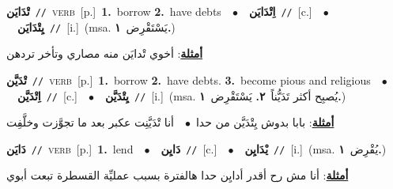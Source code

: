 \documentclass[10pt,a4paper,twoside]{article} %
\begin{document}
\begin{multicols}{2}
{\setlength\topsep{0pt}\textbf{\foreignlanguage{arabic}{تْدَايَن}}\ {\color{gray}\texttt{//}\color{black}}\ \textsc{verb}\ [p.]\ \textbf{1.}~borrow  \textbf{2.}~have debts\ \ $\bullet$\ \ \setlength\topsep{0pt}\textbf{\foreignlanguage{arabic}{اِتْدَايَن}}\ {\color{gray}\texttt{//}\color{black}}\ [c.]\ \ $\bullet$\ \ \setlength\topsep{0pt}\textbf{\foreignlanguage{arabic}{يِتْدَايَن}}\ {\color{gray}\texttt{//}\color{black}}\ [i.]\ \color{gray}(msa. \foreignlanguage{arabic}{يَسْتَقْرِض}~\foreignlanguage{arabic}{\textbf{١.}})\color{black}\  \begin{flushright}\color{gray}\foreignlanguage{arabic}{\textbf{\underline{\foreignlanguage{arabic}{أمثلة}}}: أخوي تْدايَن منه مصاري وتأخر تردهن}\end{flushright}\color{black}} \vspace{2mm}

{\setlength\topsep{0pt}\textbf{\foreignlanguage{arabic}{تْدَيَّن}}\ {\color{gray}\texttt{//}\color{black}}\ \textsc{verb}\ [p.]\ \textbf{1.}~borrow  \textbf{2.}~have debts.  \textbf{3.}~become pious and religious\ \ $\bullet$\ \ \setlength\topsep{0pt}\textbf{\foreignlanguage{arabic}{اِتْدَيَّن}}\ {\color{gray}\texttt{//}\color{black}}\ [c.]\ \ $\bullet$\ \ \setlength\topsep{0pt}\textbf{\foreignlanguage{arabic}{يِتْدَيَّن}}\ {\color{gray}\texttt{//}\color{black}}\ [i.]\ \color{gray}(msa. \foreignlanguage{arabic}{يُصبِح أكثر تَدَيُّناً}~\foreignlanguage{arabic}{\textbf{٢.}}  \foreignlanguage{arabic}{يَسْتَقْرِض}~\foreignlanguage{arabic}{\textbf{١.}})\color{black}\  \begin{flushright}\color{gray}\foreignlanguage{arabic}{\textbf{\underline{\foreignlanguage{arabic}{أمثلة}}}: بابا بدوش يِتْدَيَّن من حدا\ $\bullet$\ \  أنا تْدَيَّنِت عكبر بعد ما تجوَّزت وخلَّفِت}\end{flushright}\color{black}} \vspace{2mm}

{\setlength\topsep{0pt}\textbf{\foreignlanguage{arabic}{دَايَن}}\ {\color{gray}\texttt{//}\color{black}}\ \textsc{verb}\ [p.]\ \textbf{1.}~lend\ \ $\bullet$\ \ \setlength\topsep{0pt}\textbf{\foreignlanguage{arabic}{دَايِن}}\ {\color{gray}\texttt{//}\color{black}}\ [c.]\ \ $\bullet$\ \ \setlength\topsep{0pt}\textbf{\foreignlanguage{arabic}{يْدَايِن}}\ {\color{gray}\texttt{//}\color{black}}\ [i.]\ \color{gray}(msa. \foreignlanguage{arabic}{يُقْرِض}~\foreignlanguage{arabic}{\textbf{١.}})\color{black}\  \begin{flushright}\color{gray}\foreignlanguage{arabic}{\textbf{\underline{\foreignlanguage{arabic}{أمثلة}}}: أنا مش رح أقدر أدايِن حدا هالفترة بسبب عمليِّة القسطرة تبعت أبوي}\end{flushright}\color{black}} \vspace{2mm}


\end{multicols}
\end{document}
